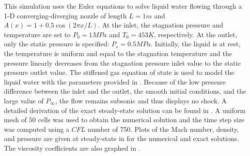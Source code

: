 This simulation uses the Euler equations to solve liquid water flowing through a 1-D converging-diverging nozzle of length $L=1m$ and $A(x) = 1 + 0.5 \cos(2 \pi x / L)$.  At the inlet, the stagnation pressure and temperature are set to $P_0 = 1 MPa$ and $T_0 = 453 K$, respectively. At the outlet, only the static pressure is specified: $P_s = 0.5MPa$. 
Initially, the liquid is at rest, the temperature is uniform and equal to the stagnation temperature and the pressure linearly decreases from the stagnation pressure inlet value to the static pressure outlet value. 
The stiffened gas equation of state is used to model the liquid water with the parameters provided in .
Because of the low pressure difference between the inlet and the outlet, the smooth initial conditions, and the large value of $P_\infty$, the flow remains subsonic and thus displays no shock. A detailed derivation of the exact steady-state solution can be found in \cite{nozzle_exact}. A uniform mesh of $50$ cells was used to obtain the numerical solution and the time step size was computed using a $CFL$ number of 750.
Plots of the Mach number, density, and pressure are given at steady-state in  for the numerical and exact solutions. The viscosity coefficients are also graphed in . 

